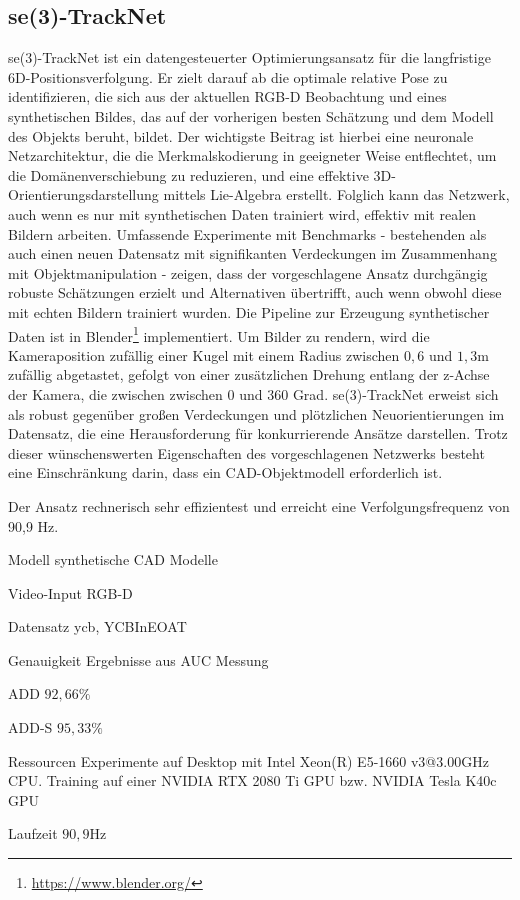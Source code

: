 \documentclass[a4paper, 11pt]{article}
\begin{document}
\begin{multicols*}{2}
    \subsection{se(3)-TrackNet}
    se(3)-TrackNet\cite{se-TrackNet} ist ein datengesteuerter Optimierungsansatz für die langfristige 6D-Positionsverfolgung. Er zielt darauf ab die optimale relative Pose zu identifizieren, die sich aus der aktuellen RGB-D Beobachtung und eines synthetischen Bildes, das auf der vorherigen besten Schätzung und dem Modell des Objekts beruht, bildet. Der wichtigste Beitrag ist hierbei eine neuronale Netzarchitektur, die die Merkmalskodierung in geeigneter Weise entflechtet, um die Domänenverschiebung zu reduzieren, und eine effektive 3D-Orientierungsdarstellung mittels Lie-Algebra erstellt. Folglich kann das Netzwerk, auch wenn es nur mit synthetischen Daten trainiert wird, effektiv mit realen Bildern arbeiten.
    Umfassende Experimente mit Benchmarks - bestehenden als auch einen neuen Datensatz mit signifikanten Verdeckungen im Zusammenhang mit Objektmanipulation - zeigen, dass der vorgeschlagene Ansatz durchgängig robuste Schätzungen erzielt und Alternativen übertrifft, auch wenn obwohl diese mit echten Bildern trainiert wurden.
    Die Pipeline zur Erzeugung synthetischer Daten ist in Blender\footnote{\href{https://www.blender.org/}{https://www.blender.org/}} implementiert. Um Bilder zu rendern, wird die Kameraposition zufällig einer Kugel mit einem Radius zwischen $0,6$ und $1,3$m zufällig abgetastet, gefolgt von einer zusätzlichen Drehung entlang der z-Achse der Kamera, die zwischen zwischen $0$ und $360$ Grad.
    se(3)-TrackNet erweist sich als robust gegenüber großen Verdeckungen und plötzlichen Neuorientierungen im Datensatz, die eine Herausforderung für konkurrierende Ansätze darstellen. Trotz dieser wünschenswerten Eigenschaften des vorgeschlagenen Netzwerks besteht eine Einschränkung darin, dass ein CAD-Objektmodell erforderlich ist.

    Der Ansatz rechnerisch sehr effizientest und erreicht eine Verfolgungsfrequenz von 90,9 Hz.

    \begin{description*}
        \item[Modell] synthetische CAD Modelle
        \item[Video-Input] RGB-D
        \item[Datensatz] \Gls{ycb}, \Gls{YCBInEOAT}
        \item[Genauigkeit] Ergebnisse aus \Gls{AUC} Messung
        \begin{itemize*}
            \item ADD $92,66\%$
            \item ADD-S $95,33\%$
        \end{itemize*}
        \item[Ressourcen] Experimente auf Desktop mit Intel Xeon(R) E5-1660 v3@3.00GHz CPU. Training auf einer NVIDIA RTX 2080 Ti GPU bzw. NVIDIA Tesla K40c GPU
        \item[Laufzeit] $90,9$Hz
    \end{description*}


\end{multicols*}
\end{document}
